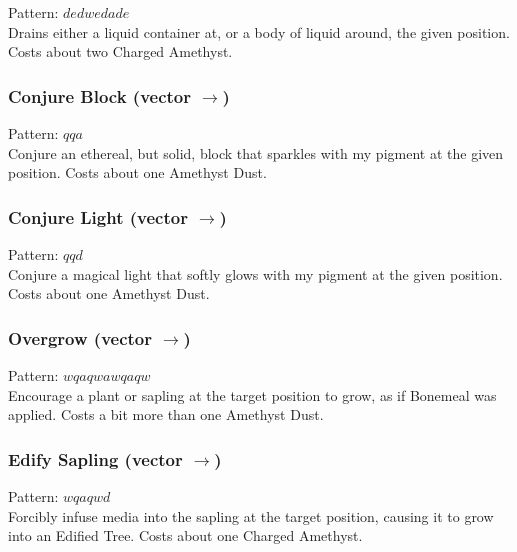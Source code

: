 \documentclass[12pt]{article}
\begin{document}
    Pattern: $dedwedade$\\
      Drains either a liquid container at, or a body of liquid around, the given position. Costs about two Charged Amethyst.\\


  \label{sec: patterns/spells/blockworks@hexcasting:conjure_block}
\subsubsection*{Conjure Block (vector $\rightarrow$)}

    Pattern: $qqa$\\
      Conjure an ethereal, but solid, block that sparkles with my pigment at the given position. Costs about one Amethyst Dust.\\


  \label{sec: patterns/spells/blockworks@hexcasting:conjure_light}
\subsubsection*{Conjure Light (vector $\rightarrow$)}

    Pattern: $qqd$\\
      Conjure a magical light that softly glows with my pigment at the given position. Costs about one Amethyst Dust.\\


  \label{sec: patterns/spells/blockworks@hexcasting:bonemeal}
\subsubsection*{Overgrow (vector $\rightarrow$)}

    Pattern: $wqaqwawqaqw$\\
      Encourage a plant or sapling at the target position to grow, as if Bonemeal was applied. Costs a bit more than one Amethyst Dust.\\


  \label{sec: patterns/spells/blockworks@hexcasting:edify}
\subsubsection*{Edify Sapling (vector $\rightarrow$)}

    Pattern: $wqaqwd$\\
      Forcibly infuse media into the sapling at the target position, causing it to grow into an Edified Tree. Costs about one Charged Amethyst.\\
\end{document}

